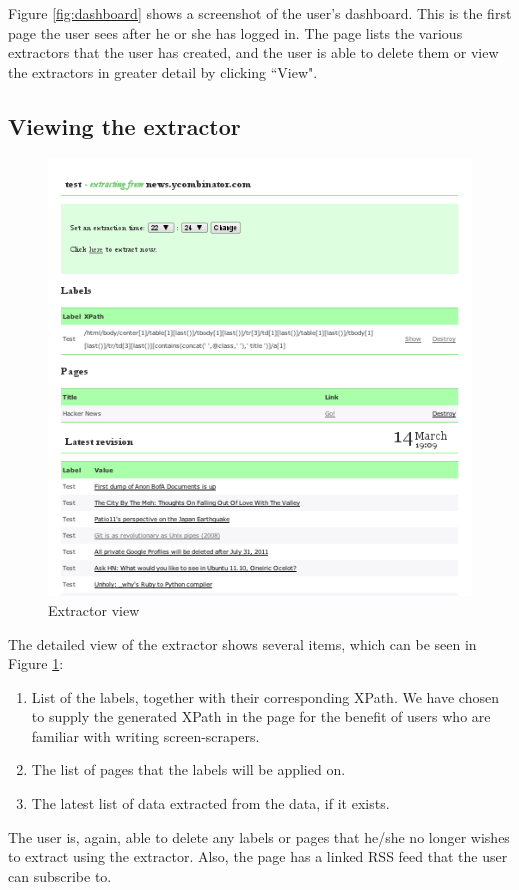  
 Figure \ref{fig:dashboard}
 shows a screenshot of the user's dashboard. This is the first page the user sees after he or
 she has logged in. The page lists the various extractors that the user has created, and the 
 user is able to delete them or view the extractors in greater detail by clicking ``View".
 
 \subsection{Viewing the extractor}

\begin{figure}[htbp]
\centering
\includegraphics[scale=0.5]{extractorview.png} 
\caption{Extractor view}
\label{fig:extractorview}
\end{figure}
 The detailed view of the extractor shows several items,
  which can be seen in Figure \ref{fig:extractorview}:
 \begin{enumerate}
 	\item List of the labels, together with their corresponding XPath.
 	We have chosen to supply the generated XPath in the page for the benefit
	of users who are familiar with writing screen-scrapers.
 	\item The list of pages that the labels will be applied on.
 	\item The latest list of data extracted from the data, if it exists.
 \end{enumerate}
 The user is, again, able to delete any labels or pages that he/she no longer wishes to extract
 using the extractor. Also, the page has a linked RSS feed that the user can subscribe to.
 
